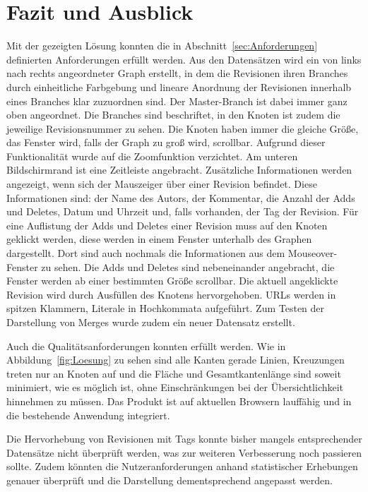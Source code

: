 \documentclass[nocolor]{tudbook}
\begin{document}
\chapter{Fazit und Ausblick}
Mit der gezeigten Lösung konnten die in Abschnitt~\ref{sec:Anforderungen} definierten Anforderungen erfüllt werden. Aus den Datensätzen wird ein von links nach rechts angeordneter Graph erstellt, in dem die Revisionen ihren Branches durch einheitliche Farbgebung und lineare Anordnung der Revisionen innerhalb eines Branches klar zuzuordnen sind. Der Master-Branch ist dabei immer ganz oben angeordnet. Die Branches sind beschriftet, in den Knoten ist zudem die jeweilige Revisionsnummer zu sehen. Die Knoten haben immer die gleiche Größe, das Fenster wird, falls der Graph zu groß wird, scrollbar. Aufgrund dieser Funktionalität wurde auf die Zoomfunktion verzichtet. Am unteren Bildschirmrand ist eine Zeitleiste angebracht. Zusätzliche Informationen werden angezeigt, wenn sich der Mauszeiger über einer Revision befindet. Diese Informationen sind: der Name des Autors, der Kommentar, die Anzahl der Adds und Deletes, Datum und Uhrzeit und, falls vorhanden, der Tag der Revision. Für eine Auflistung der Adds und Deletes einer Revision muss auf den Knoten geklickt werden, diese werden in einem Fenster unterhalb des Graphen dargestellt. Dort sind auch nochmals die Informationen aus dem Mouseover-Fenster zu sehen. Die Adds und Deletes sind nebeneinander angebracht, die Fenster werden ab einer bestimmten Größe scrollbar. Die aktuell angeklickte Revision wird durch Ausfüllen des Knotens hervorgehoben. URLs werden in spitzen Klammern, Literale in Hochkommata aufgeführt. Zum Testen der Darstellung von Merges wurde zudem ein neuer Datensatz erstellt.

Auch die Qualitätsanforderungen konnten erfüllt werden. Wie in Abbildung~\ref{fig:Loesung} zu sehen sind alle Kanten gerade Linien, Kreuzungen treten nur an Knoten auf und die Fläche und Gesamtkantenlänge sind soweit minimiert, wie es  möglich ist, ohne Einschränkungen bei der Übersichtlichkeit hinnehmen zu müssen. Das Produkt ist auf aktuellen Browsern lauffähig und in die bestehende Anwendung integriert.

Die Hervorhebung von Revisionen mit Tags konnte bisher mangels entsprechender Datensätze nicht überprüft werden, was zur weiteren Verbesserung noch passieren sollte. Zudem könnten die Nutzeranforderungen anhand statistischer Erhebungen genauer überprüft und die Darstellung dementsprechend angepasst werden.



\listoffigures
\end{document}
